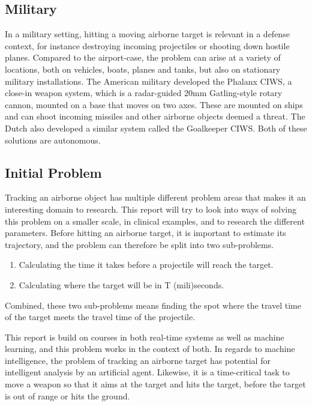 \subsection{Military}
In a military setting, hitting a moving airborne target is relevant in a defense context, for instance destroying incoming projectiles or shooting down hostile planes.
Compared to the airport-case, the problem can arise at a variety of locations, both on vehicles, boats, planes and tanks, but also on stationary military installations.
The American military developed the Phalanx CIWS, a close-in weapon system, which is a radar-guided 20mm Gatling-style rotary cannon, mounted on a base that moves on two axes\cite{PhalanxCIWS}.
These are mounted on ships and can shoot incoming missiles and other airborne objects deemed a threat.
The Dutch also developed a similar system called the Goalkeeper CIWS.
Both of these solutions are autonomous.

\subsection{Initial Problem}

Tracking an airborne object has multiple different problem areas that makes it an interesting domain to research.
This report will try to look into ways of solving this problem on a smaller scale, in clinical examples, and to research the different parameters.
Before hitting an airborne target, it is important to estimate its trajectory, and the problem can therefore be split into two sub-problems.
\begin{enumerate}
  \item Calculating the time it takes before a projectile will reach the target.
  \item Calculating where the target will be in T (mili)seconds.
\end{enumerate}
Combined, these two sub-problems means finding the spot where the travel time of the target meets the travel time of the projectile.

This report is build on courses in both real-time systems as well as machine learning, and this problem works in the context of both.
In regards to machine intelligence, the problem of tracking an airborne target has potential for intelligent analysis by an artificial agent.
Likewise, it is a time-critical task to move a weapon so that it aims at the target and hits the target, before the target is out of range or hits the ground.

